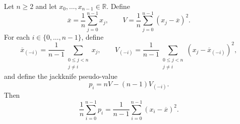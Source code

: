 \begin{theorem}
Let $n\geq2$ and let $x_0,\ldots,x_{n-1}\in\mathbb R$. Define
\[
 \overline x=\frac1n\sum_{j=0}^{n-1}x_j,
 \qquad
 V=\frac1n\sum_{j=0}^{n-1}(x_j-\overline x)^2.
\]
For each $i\in\{0,\ldots,n-1\}$, define
\[
 \overline x_{(-i)}=\frac1{n-1}\sum_{\substack{0\leq j<n\\j\ne i}}x_j,
 \qquad
 V_{(-i)}=\frac1{n-1}
 \sum_{\substack{0\leq j<n\\j\ne i}}
 (x_j-\overline x_{(-i)})^2,
\]
and define the jackknife pseudo-value
\[
 p_i=nV-(n-1)V_{(-i)}.
\]
Then
\[
 \frac1n\sum_{i=0}^{n-1}p_i
 =\frac1{n-1}\sum_{i=0}^{n-1}(x_i-\overline x)^2.
\]
\end{theorem}
